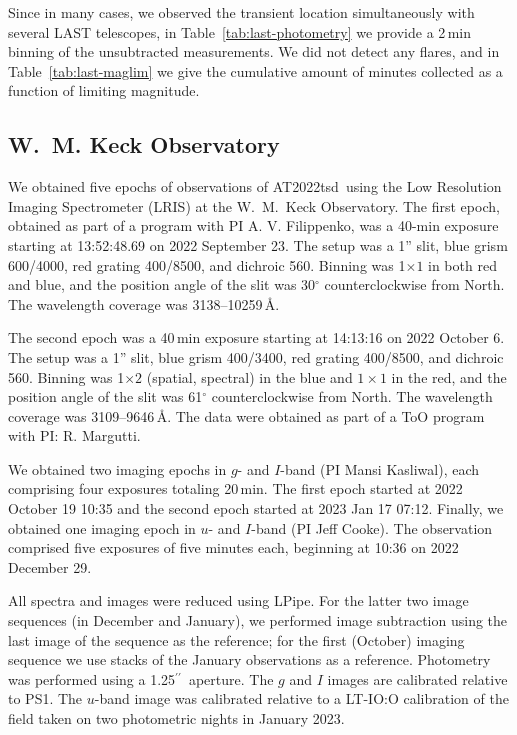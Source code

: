 \documentclass{nature_plusfigure}
\newcommand{\at}{AT2022tsd}
\newcommand{\ayqh}[1]{{\textcolor{red}{\texttt{AYQH: #1}}}}
\newcommand{\arcsec}{$^{\prime\prime}$}
\begin{document}
\begin{methods}
Since in many cases, we observed the transient location simultaneously with several LAST telescopes, in Table~\ref{tab:last-photometry} we provide a 2\,min binning of the unsubtracted measurements. We did not detect any flares, and in Table~\ref{tab:last-maglim} we give the cumulative amount of minutes collected as a function of limiting magnitude.



\subsection{W.~M. Keck Observatory}
\label{sec:keck}

We obtained five epochs of observations of \at\ using the Low Resolution Imaging Spectrometer (LRIS) at the W.~M.~Keck Observatory. The first epoch, obtained as part of a program with PI A. V. Filippenko, was a 40-min exposure starting at 13:52:48.69 on 2022 September 23. The setup was a 1'' slit, blue grism 600/4000, red grating 400/8500, and dichroic 560. Binning was 1$\times1$ in both red and blue, and the position angle of the slit was 30$^\circ$ counterclockwise from North. The wavelength coverage was 3138--10259\,\AA. 

The second epoch was a 40\,min exposure starting at 14:13:16 on 2022 October 6. The setup was a 1'' slit, blue grism 400/3400, red grating 400/8500, and dichroic 560. Binning was 1$\times2$ (spatial, spectral) in the blue and $1\times1$ in the red, and the position angle of the slit was 61$^\circ$ counterclockwise from North. The wavelength coverage was 3109--9646\,\AA. The data were obtained as part of a ToO program with PI: R. Margutti. 

We obtained two imaging epochs in $g$- and $I$-band (PI Mansi Kasliwal), each comprising four exposures totaling 20\,min. The first epoch started at 2022 October 19 10:35 and the second epoch started at 2023 Jan 17 07:12. 
Finally, we obtained one imaging epoch in $u$- and $I$-band (PI Jeff Cooke). The observation comprised five exposures of five minutes each, beginning at 10:36 on 2022 December 29.

All spectra and images were reduced using LPipe\cite{PerleyLPipe}.
For the latter two image sequences (in December and January), we performed image subtraction using the last image of the sequence as the reference; for the first (October) imaging sequence we use stacks of the January observations as a reference.  Photometry was performed using a 1.25\arcsec\ aperture.  The $g$ and $I$ images are calibrated relative to PS1.  The $u$-band image was calibrated relative to a LT-IO:O calibration of the field taken on two photometric nights in January 2023.


\end{methods}
\end{document}
